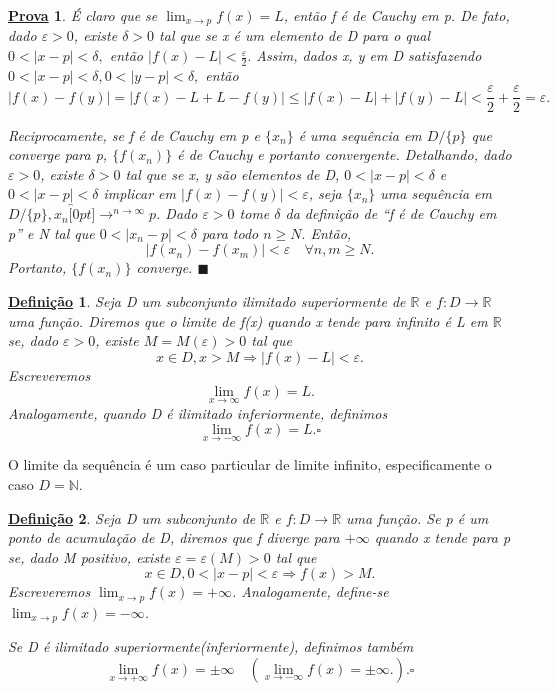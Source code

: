 \documentclass{article}
\newtheorem*{def*}{\underline{Defini\c c\~ao}}
\newtheorem*{proof*}{\underline{Prova}}
\renewcommand\qedsymbol{$\blacksquare$}
\begin{document}
\begin{proof*}
  \'E claro que se $\lim_{x\to p}f(x) = L$, ent\~ao f \'e de Cauchy em p. De fato, dado $\varepsilon > 0$, existe $\delta > 0$ 
  tal que se x \'e um elemento de D para o qual $0<|x-p|<\delta,$ ent\~ao $|f(x)-L|<\frac{\varepsilon}{2}.$ Assim, dados
  x, y em D satisfazendo $0<|x-p|<\delta, 0<|y-p|<\delta,$ ent\~ao 
    $$
      |f(x)-f(y)| = |f(x)-L+L-f(y)|\leq{|f(x)-L| + |f(y)-L|}< \frac{\varepsilon}{2}+\frac{\varepsilon}{2} = \varepsilon.
    $$

  Reciprocamente, se f \'e de Cauchy em p e $\{x_{n}\}$ \'e uma sequ\^encia em $D/\{p\}$ que converge para p, 
  $\{f(x_{n})\}$ \'e de Cauchy e portanto convergente. Detalhando, dado $\varepsilon > 0$, existe $\delta > 0$ tal que 
  se x, y s\~ao elementos de D, $0 < |x-p| <\delta$ e $0 < |x-p| <\delta$ implicar em $|f(x)-f(y)|<\varepsilon$,
seja $\{x_{n}\}$ uma sequ\^encia em $D/\{p\}, x_{n}\overbracket[0pt]{\longrightarrow}^{n\to \infty}p$. Dado $\varepsilon > 0$
tome $\delta$ da defini\c c\~ao de ``f \'e de Cauchy em p'' e N tal que $0<|x_{n}-p|<\delta$ para todo $n\geq{N}.$ Ent\~ao, 
  $$
  |f(x_{n})-f(x_{m})| < \varepsilon\quad \forall n, m\geq{N}.
  $$
  Portanto, $\{f(x_{n})\}$ converge. \qedsymbol
\end{proof*}
\begin{def*}
  Seja D um subconjunto ilimitado superiormente de $\mathbb{R}$ e $f:D\rightarrow \mathbb{R}$ uma fun\c c\~ao. Diremos que 
  o limite de f(x) quando x tende para infinito \'e L em $\mathbb{R}$ se, dado $\varepsilon > 0$, existe $M = M(\varepsilon) > 0$
  tal que 
    $$
      x\in D, x > M \Rightarrow |f(x)-L|<\varepsilon.
    $$
  Escreveremos 
    $$
      \lim_{x\to\infty}f(x) = L.
    $$
  Analogamente, quando D \'e ilimitado inferiormente, definimos 
    $$
      \lim_{x\to-\infty}f(x) = L.\square
    $$
\end{def*}
  O limite da sequ\^encia \'e um caso particular de limite infinito, especificamente o caso $D = \mathbb{N}.$
 \begin{def*}
   Seja D um subconjunto de $\mathbb{R}$ e $f:D\rightarrow \mathbb{R}$ uma fun\c c\~ao. Se p \'e um ponto de acumula\c c\~ao de D,
   diremos que f diverge para $+\infty$ quando x tende para p se, dado M positivo, existe $\varepsilon = \varepsilon(M) > 0$
   tal que 
     $$
       x\in D, 0<|x-p|<\varepsilon \Rightarrow f(x) > M.
     $$
     Escreveremos $\lim_{x\to p}f(x) = +\infty$. Analogamente, define-se $\lim_{x\to p}f(x) =-\infty$. 

     Se D \'e ilimitado superiormente(inferiormente), definimos tamb\'em 
       $$
         \lim_{x\to+\infty}f(x) = \pm\infty\quad(\lim_{x\to-\infty}f(x)=\pm\infty.). \square
       $$
 \end{def*}
\end{document}
